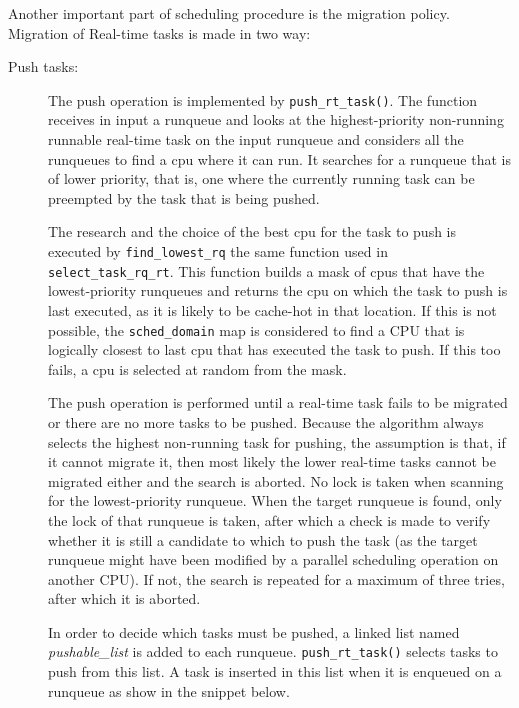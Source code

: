 Another important part of scheduling procedure is the migration policy. Migration of Real-time tasks is made in two way: 

\begin{description}
\item[Push tasks:] The push operation is implemented by \texttt{push\_rt\_task()}. The function receives in input a runqueue and looks at the 
highest-priority non-running runnable real-time task on the input runqueue and considers all the runqueues to find a cpu where it can run. It searches for 
a runqueue that is of lower priority, that is, one where the currently running task can be preempted by the task that is being pushed. 

The research and the choice of the best cpu for the task to push is executed by \texttt{find\_lowest\_rq} the same function used in 
\texttt{select\_task\_rq\_rt}. This function builds a mask of cpus that have the lowest-priority runqueues and returns the cpu on which the task to push is 
last executed, as it is likely to be cache-hot in that location. If this is not possible, the \texttt{sched\_domain} map is considered to find a CPU that 
is logically closest to last cpu that has executed the task to push. If this too fails, a cpu is selected at random from the mask.

The push operation is performed until a real-time task fails to be migrated or there are no more tasks to be pushed. Because the algorithm always selects 
the highest non-running task for pushing, the assumption is that, if it cannot migrate it, then most likely the lower real-time tasks cannot be migrated 
either and the search is aborted. No lock is taken when scanning for the lowest-priority runqueue. When the target runqueue is found, only the lock of that 
runqueue is taken, after which a check is made to verify whether it is still a candidate to which to push the task (as the target runqueue might have been 
modified by a parallel scheduling operation on another CPU). If not, the search is repeated for a maximum of three tries, after which it is aborted. 

In order to decide which tasks must be pushed, a linked list named \textit{pushable\_list} is added to each runqueue. \texttt{push\_rt\_task()} selects tasks
to push from this list. A task is inserted in this list when it is enqueued on a runqueue as show in the snippet below.

\lstset{basicstyle=\footnotesize, language=c, captionpos=b, frame=single, label=lis:steps}



\end{description}
